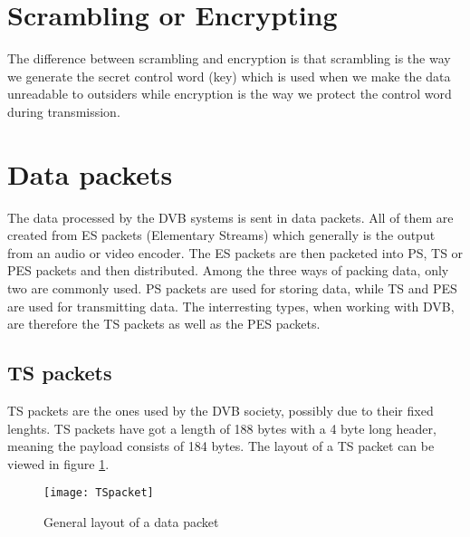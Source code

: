 
\section{Scrambling or Encrypting}
The difference between scrambling and encryption is that scrambling is the
way we generate the secret control word (key) which is used when we make the
data unreadable to outsiders while encryption is the way we protect the control 
word during transmission.

\section{Data packets}\label{sec:Data}
The data processed by the DVB systems is sent in data packets. All of them are 
created from ES packets (Elementary Streams) which generally is the output from 
an audio or video encoder. The ES packets are then packeted into PS, TS or PES 
packets and then distributed. Among the three ways of packing data, only two are 
commonly used. PS packets are used for storing data, while TS and PES are used 
for transmitting data. The interresting types, when working with DVB, are 
therefore the TS packets as well as the PES packets.

\subsection{TS packets}
TS packets are the ones used by the DVB society, possibly due to their fixed 
lenghts. TS packets have got a length of 188 bytes with a 4 byte long header, 
meaning the payload consists of 184 bytes. The layout of a TS packet can be 
viewed in figure \ref{img:Package}\citep{DVB:2013}.

\begin{figure}
  \texttt{[image: TSpacket]}
  \caption{General layout of a data packet}
  \label{img:Package}
\end{figure}

